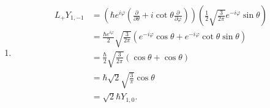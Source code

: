 \documentclass[11pt, letterpaper]{article}
\begin{document}
\begin{enumerate}
\begin{align*}
						&=\sqrt{\frac{3}{\pi } } \cos \theta \\
						&=2Y_{1,0} 
		.\end{align*}
		\begin{align*}
			\hat{\nabla }^2 Y_{1,1} &=\left( \frac{1}{\sin \theta } \frac{\partial }{\partial \theta } \left( \sin \theta \frac{\partial }{\partial \theta }  \right) +\frac{1}{\sin ^2\theta } \frac{\partial ^2}{\partial \varphi ^2}  \right) \left( -\frac{1}{2} \sqrt{\frac{3}{2\pi } } e^{i\varphi } \sin \theta  \right) \\
						&=-\frac{1}{2} \sqrt{\frac{3}{2\pi } } \left( \frac{e^{i\varphi } }{\sin \theta } \frac{\partial }{\partial \theta } \left( \sin \theta \frac{\partial }{\partial \theta } \sin \theta  \right) +\frac{1}{\sin \theta } \frac{\partial ^2}{\partial \varphi ^2} e^{i\varphi }  \right) \\
						&=-\frac{1}{2} \sqrt{\frac{3}{2\pi } } \frac{e^{i\varphi } }{\sin \theta } \left( \frac{\partial }{\partial \theta } \sin \theta \cos \theta -1 \right) \\
						&=-\frac{1}{2} \sqrt{\frac{3}{2\pi } } \frac{e^{i\varphi } }{\sin \theta }\left( -\sin ^2\theta +\cos ^2\theta -1 \right) \\
						&=-\frac{1}{2} \sqrt{\frac{3}{2\pi } }\frac{e^{i\varphi } }{\sin \theta } \left( 1-2 \sin ^2\theta -1 \right) \\
						&=\sqrt{\frac{3}{2\pi } } e^{i\varphi } \sin \theta \\
						&=2Y_{1,1} 
		.\end{align*}
		It follows that
		\[
			\frac{\hat{\nabla }^2 Y_{\ell ,m} }{Y_{\ell ,m} } =2
		\]
		for all given $Y_{\ell ,m} $.
	\item 
		\begin{align*}
			L_+ Y_{1,-1} &=\left( \hbar e^{i \varphi } \left( \frac{\partial }{\partial \theta } +i \cot \theta \frac{\partial }{\partial \varphi }  \right)  \right) \left( \frac{1}{2} \sqrt{\frac{3}{2\pi } } e^{-i \varphi } \sin \theta  \right) \\
				     &=\frac{\hbar e^{i\varphi } }{2} \sqrt{\frac{3}{2\pi } } \left( e^{-i \varphi } \cos \theta +e^{-i\varphi } \cot \theta \sin \theta  \right) \\
				     &=\frac{\hbar}{2} \sqrt{\frac{3}{2\pi } } \left( \cos \theta +\cos \theta  \right) \\
				     &=\hbar \sqrt{2}\sqrt{\frac{3}{\pi } } \cos \theta \\
				     &=\sqrt{2} \hbar Y_{1,0} 
		.\end{align*}

\end{enumerate}
\end{document}
